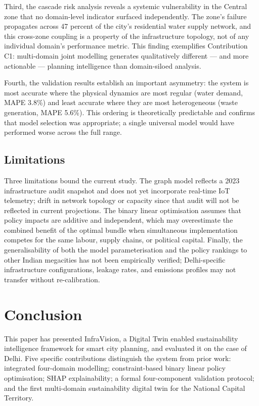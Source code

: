 \documentclass[conference]{IEEEtran}
\begin{document}
Third, the cascade risk analysis reveals a systemic vulnerability in the
Central zone that no domain-level indicator surfaced independently. The
zone's failure propagates across 47 percent of the city's residential
water supply network, and this cross-zone coupling is a property of the
infrastructure topology, not of any individual domain's performance
metric. This finding exemplifies Contribution C1: multi-domain joint
modelling generates qualitatively different --- and more actionable ---
planning intelligence than domain-siloed analysis.

Fourth, the validation results establish an important asymmetry: the
system is most accurate where the physical dynamics are most regular
(water demand, MAPE 3.8\%) and least accurate where they are most
heterogeneous (waste generation, MAPE 5.6\%). This ordering is
theoretically predictable and confirms that model selection was
appropriate; a single universal model would have performed worse across
the full range.

\subsection{Limitations}

Three limitations bound the current study. The graph model reflects a
2023 infrastructure audit snapshot and does not yet incorporate
real-time IoT telemetry; drift in network topology or capacity since
that audit will not be reflected in current projections. The binary
linear optimisation assumes that policy impacts are additive and
independent, which may overestimate the combined benefit of the optimal
bundle when simultaneous implementation competes for the same labour,
supply chains, or political capital. Finally, the generalisability of
both the model parameterisation and the policy rankings to other Indian
megacities has not been empirically verified; Delhi-specific
infrastructure configurations, leakage rates, and emissions profiles may
not transfer without re-calibration.

\section{Conclusion}
\label{sec:conclusion}

This paper has presented InfraVision, a Digital Twin enabled
sustainability intelligence framework for smart city planning, and
evaluated it on the case of Delhi. Five specific contributions
distinguish the system from prior work: integrated four-domain
modelling; constraint-based binary linear policy optimisation; SHAP
explainability; a formal four-component validation protocol; and the
first multi-domain sustainability digital twin for the National Capital
Territory.
\end{document}
